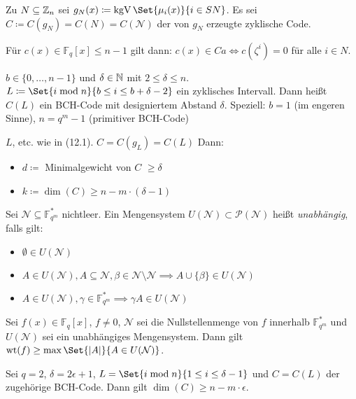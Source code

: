 \documentclass{cheat-sheet}
\newcommand{\F}{\mathbb{F}} %
\DeclareMathOperator{\wt}{wt} %
\newcommand{\Pow}{\mathcal{P}} %
\DeclareMathOperator{\kgV}{kgV} %
\begin{document}
Zu $N \subseteq \mathbb{Z}_n$ sei $g_N(x) \coloneqq \kgV \Set{\mu_i(x)}{i \in SN}$.
Es sei $C \coloneqq C(g_N) = C(N) = C(\mathcal{N})$ der von $g_N$ erzeugte zyklische Code.

Für $c(x) \in \F_q[x]{\leq n-1}$ gilt dann: $c(x) \in Ca \iff c(\zeta^i) = 0$ für alle $i \in N$.

\begin{defn}
  $b \in \{ 0, \ldots, n-1 \}$ und $\delta \in \mathbb{N}$ mit $2 \leq \delta \leq n$.
  $L \coloneqq \Set{i \bmod{n}}{b \leq i \leq b + \delta - 2}$ ein zyklisches Intervall.
  Dann heißt $C(L)$ ein BCH-Code mit designiertem Abstand $\delta$.
  Speziell: $b=1$ (im engeren Sinne), $n = q^m - 1$ (primitiver BCH-Code)
\end{defn}

\begin{satz}
  $L$, etc. wie in (12.1).
  $C = C(g_L) = C(L)$
  Dann:
  \begin{itemize}
    \item $d \coloneqq $ Minimalgewicht von $C$ $\geq \delta$
    \item $k \coloneqq \dim(C) \geq n - m \cdot (\delta - 1)$
  \end{itemize}
\end{satz}





\begin{defn}
  Sei $\mathcal{N} \subseteq \F_{q^m}^*$ nichtleer.
  Ein Mengensystem $U(\mathcal{N}) \subset \Pow(\mathcal{N})$ heißt \emph{unabhängig}, falls gilt:
  \begin{itemize}
    \item $\emptyset \in U(\mathcal{N})$
    \item $A \in U(\mathcal{N}), A \subseteq \mathcal{N}, \beta \in \mathcal{N} \setminus \mathcal{N} \implies A \cup \{ \beta \} \in U(\mathcal{N})$
    \item $A \in U(\mathcal{N}), \gamma \in \F_{q^m}^* \implies \gamma A \in U(\mathcal{N})$
  \end{itemize}
\end{defn}

\begin{prop}
  Sei $f(x) \in \F_q[x]$, $f \neq 0$, $\mathcal{N}$ sei die Nullstellenmenge von $f$ innerhalb $\F_{q^m}^*$ und $U(\mathcal{N})$ sei ein unabhängiges Mengensystem.
  Dann gilt \enspace $\wt(f) \geq \max \Set{\abs{A}}{A \in U(\mathcal{N})}$.
\end{prop}



\begin{satz}
  Sei $q = 2$, $\delta = 2 \epsilon + 1$, $L = \Set{i \bmod{n}}{1 \leq i \leq \delta - 1}$ und $C = C(L)$ der zugehörige BCH-Code.
  Dann gilt $\dim(C) \geq n - m \cdot \epsilon$.
\end{satz}

\end{document}

